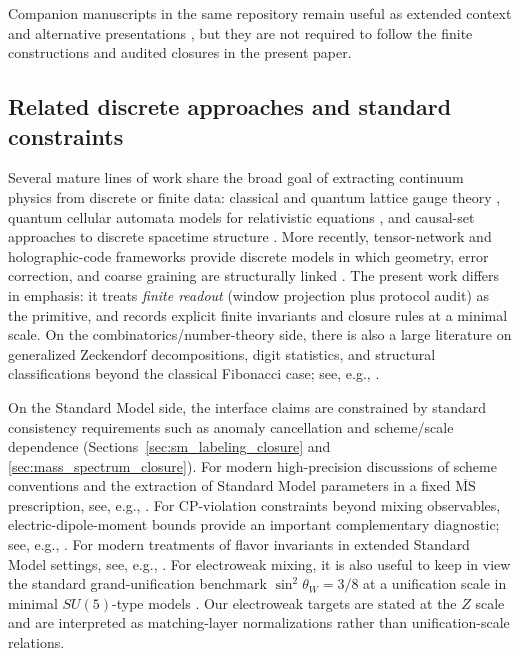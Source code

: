Companion manuscripts in the same repository remain useful as extended context and alternative presentations \cite{Ma2025HPA,Ma2025CAP,Ma2025CAPII,Ma2025HHU,Ma2025HPT,Ma2025PCG,Ma2025RF,Ma2025HPOT,Ma2025FoP}, but they are not required to follow the finite constructions and audited closures in the present paper.

\subsection{Related discrete approaches and standard constraints}
Several mature lines of work share the broad goal of extracting continuum physics from discrete or finite data:
classical and quantum lattice gauge theory \cite{Wilson1974,KogutSusskind1975HamiltonianLGT,Rothe2012},
quantum cellular automata models for relativistic equations \cite{BialynickiBirula1994QCA},
and causal-set approaches to discrete spacetime structure \cite{Bombelli1987CausalSet}.
More recently, tensor-network and holographic-code frameworks provide discrete models in which geometry, error correction, and coarse graining are structurally linked \cite{Vidal2007MERA,Swingle2012EntanglementHolography,Pastawski2015HolographicCodes}.
The present work differs in emphasis: it treats \emph{finite readout} (window projection plus protocol audit) as the primitive, and records explicit finite invariants and closure rules at a minimal scale.
On the combinatorics/number-theory side, there is also a large literature on generalized Zeckendorf decompositions, digit statistics, and structural classifications beyond the classical Fibonacci case; see, e.g., \cite{DemontignyEtAl2013FDecompositions,BenAriMiller2014ProbabilisticZeckendorf,Dekking2020StructureZeckendorf}.

On the Standard Model side, the interface claims are constrained by standard consistency requirements such as anomaly cancellation and scheme/scale dependence (Sections~\ref{sec:sm_labeling_closure} and \ref{sec:mass_spectrum_closure}).
For modern high-precision discussions of scheme conventions and the extraction of Standard Model parameters in a fixed $\overline{\mathrm{MS}}$ prescription, see, e.g., \cite{MartinRobertson2019TadpoleFreeMSbar}.
For CP-violation constraints beyond mixing observables, electric-dipole-moment bounds provide an important complementary diagnostic; see, e.g., \cite{Fukuyama2013EDM}.
For modern treatments of flavor invariants in extended Standard Model settings, see, e.g., \cite{deLimaNishi2024FlavorInvariantsVLQ}.
For electroweak mixing, it is also useful to keep in view the standard grand-unification benchmark $\sin^2\theta_W=3/8$ at a unification scale in minimal $SU(5)$-type models \cite{GeorgiGlashow1974SU5,Langacker1981GUT}.
Our electroweak targets are stated at the $Z$ scale and are interpreted as matching-layer normalizations rather than unification-scale relations.

